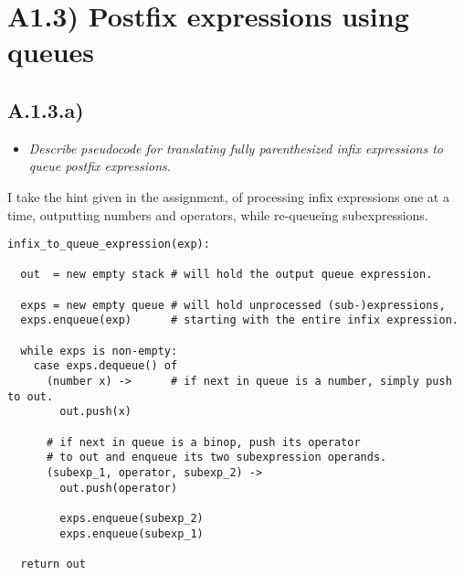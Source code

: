 \newpage
\section{A1.3) Postfix expressions using queues}

\subsection{A.1.3.a)}

\begin{itemize}
    \item \emph{Describe pseudocode for translating fully parenthesized infix
      expressions to queue postfix expressions.}
\end{itemize}

I take the hint given in the assignment, of processing infix expressions one at
a time, outputting numbers and operators, while re-queueing subexpressions.

\begin{verbatim}
infix_to_queue_expression(exp):

  out  = new empty stack # will hold the output queue expression.

  exps = new empty queue # will hold unprocessed (sub-)expressions,
  exps.enqueue(exp)      # starting with the entire infix expression.

  while exps is non-empty:
    case exps.dequeue() of
      (number x) ->      # if next in queue is a number, simply push to out.
        out.push(x)

      # if next in queue is a binop, push its operator
      # to out and enqueue its two subexpression operands.
      (subexp_1, operator, subexp_2) ->
        out.push(operator)

        exps.enqueue(subexp_2)
        exps.enqueue(subexp_1)

  return out
\end{verbatim}


\newpage


